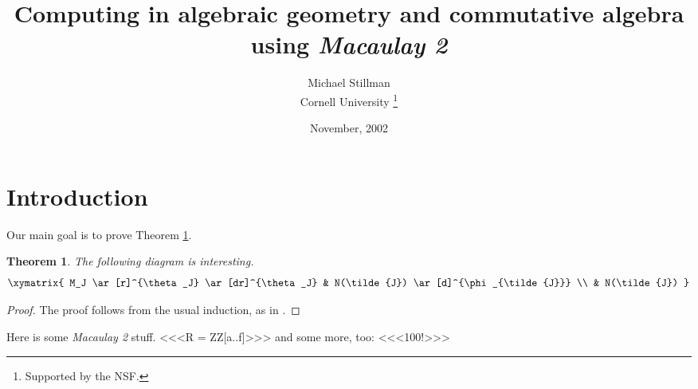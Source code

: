 \documentclass{article}
\newtheorem{theorem}	{Theorem}	[section]
\begin{document}
\author{Michael Stillman \\ Cornell University
	\thanks{Supported by the NSF.}
	}
\date{November, 2002}
\title{Computing in algebraic geometry and commutative algebra using {\it
	Macaulay 2}}
\maketitle

\section{Introduction}
Our main goal is to prove Theorem \ref{thm1}.

\begin{theorem} \label{thm1}
The following diagram is interesting.
$$
\xymatrix{
M_J \ar[r]^{\theta_J}  \ar[dr]^{\theta_J} & 
	N(\tilde{J}) \ar[d]^{\phi_{\tilde{J}}} \\
& N(\tilde{J}) 
}
$$
\end{theorem}

\begin{proof}
The proof follows from the usual induction, as in \cite{MR94g:19005}.
\end{proof}

Here is some {\sl Macaulay 2} stuff.
<<<R = ZZ[a..f]>>>
and some more, too:
<<<100!>>>



\end{document}
